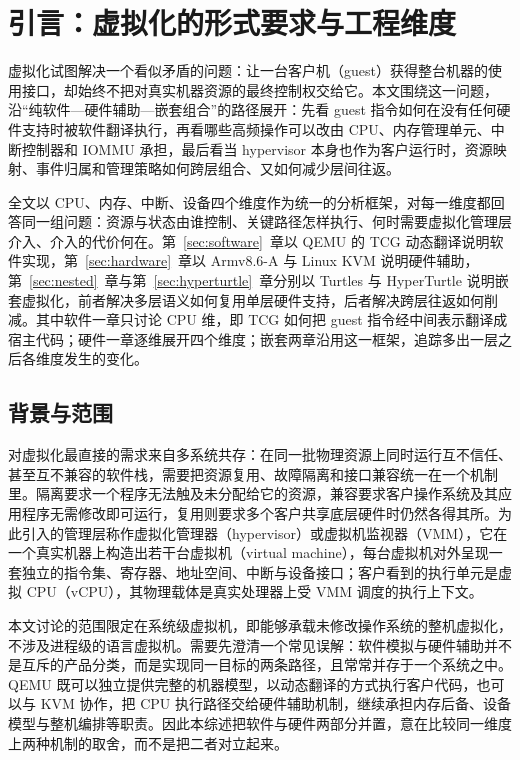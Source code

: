 \chapter{引言：虚拟化的形式要求与工程维度}\label{sec:intro}

虚拟化试图解决一个看似矛盾的问题：让一台客户机（guest）获得整台机器的使用接口，却始终不把对真实机器资源的最终控制权交给它\cite{source1}。本文围绕这一问题，沿“纯软件—硬件辅助—嵌套组合”的路径展开：先看 guest 指令如何在没有任何硬件支持时被软件翻译执行，再看哪些高频操作可以改由 CPU、内存管理单元、中断控制器和 IOMMU 承担，最后看当 hypervisor 本身也作为客户运行时，资源映射、事件归属和管理策略如何跨层组合、又如何减少层间往返。

全文以 CPU、内存、中断、设备四个维度作为统一的分析框架，对每一维度都回答同一组问题：资源与状态由谁控制、关键路径怎样执行、何时需要虚拟化管理层介入、介入的代价何在。第~\ref{sec:software}~章以 QEMU 的 TCG 动态翻译说明软件实现，第~\ref{sec:hardware}~章以 Armv8.6-A 与 Linux KVM 说明硬件辅助，第~\ref{sec:nested}~章与第~\ref{sec:hyperturtle}~章分别以 Turtles 与 HyperTurtle 说明嵌套虚拟化，前者解决多层语义如何复用单层硬件支持，后者解决跨层往返如何削减。其中软件一章只讨论 CPU 维，即 TCG 如何把 guest 指令经中间表示翻译成宿主代码；硬件一章逐维展开四个维度；嵌套两章沿用这一框架，追踪多出一层之后各维度发生的变化。

\section{背景与范围}\label{sec:intro-bg}

对虚拟化最直接的需求来自多系统共存：在同一批物理资源上同时运行互不信任、甚至互不兼容的软件栈，需要把资源复用、故障隔离和接口兼容统一在一个机制里。隔离要求一个程序无法触及未分配给它的资源，兼容要求客户操作系统及其应用程序无需修改即可运行，复用则要求多个客户共享底层硬件时仍然各得其所。为此引入的管理层称作虚拟化管理器（hypervisor）或虚拟机监视器（VMM），它在一个真实机器上构造出若干台虚拟机（virtual machine），每台虚拟机对外呈现一套独立的指令集、寄存器、地址空间、中断与设备接口；客户看到的执行单元是虚拟 CPU（vCPU），其物理载体是真实处理器上受 VMM 调度的执行上下文。

本文讨论的范围限定在系统级虚拟机，即能够承载未修改操作系统的整机虚拟化，不涉及进程级的语言虚拟机。需要先澄清一个常见误解：软件模拟与硬件辅助并不是互斥的产品分类，而是实现同一目标的两条路径，且常常并存于一个系统之中。QEMU 既可以独立提供完整的机器模型，以动态翻译的方式执行客户代码，也可以与 KVM 协作，把 CPU 执行路径交给硬件辅助机制，继续承担内存后备、设备模型与整机编排等职责\cite{source2,source3,source5}。因此本综述把软件与硬件两部分并置，意在比较同一维度上两种机制的取舍，而不是把二者对立起来。

